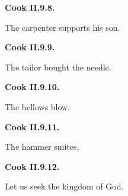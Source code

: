 \par\begin{minipage}{\linewidth}\raggedright
\textbf{Cook II.9.8.}

The carpenter supports his son.

\end{minipage}\par\addvspace{4pt}

\par\begin{minipage}{\linewidth}\raggedright
\textbf{Cook II.9.9.}

The tailor bought the needle.

\end{minipage}\par\addvspace{4pt}

\par\begin{minipage}{\linewidth}\raggedright
\textbf{Cook II.9.10.}

The bellows blow.

\end{minipage}\par\addvspace{4pt}

\par\begin{minipage}{\linewidth}\raggedright
\textbf{Cook II.9.11.}

The hammer smites,

\end{minipage}\par\addvspace{4pt}

\par\begin{minipage}{\linewidth}\raggedright
\textbf{Cook II.9.12.}

Let us seek the kingdom of God.

\end{minipage}\par\addvspace{4pt}

